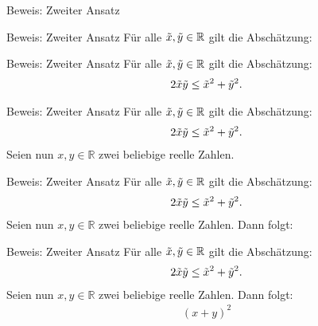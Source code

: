 \documentclass[10pt]{beamer}
\def\bR{\mathbb{R}}
\begin{document}
\begin{frame}{Beweis: Zweiter Ansatz}
    
\end{frame}



\begin{frame}{Beweis: Zweiter Ansatz}
    Für alle \( \Tilde{x}, \Tilde{y} \in \bR \) gilt die Abschätzung:
\end{frame}



\begin{frame}{Beweis: Zweiter Ansatz}
    Für alle \( \Tilde{x}, \Tilde{y} \in \bR \) gilt die Abschätzung:
    \begin{align*}
        2\Tilde{x}\Tilde{y}
        \leq \Tilde{x}^{2} + \Tilde{y}^{2}.
    \end{align*}
\end{frame}



\begin{frame}{Beweis: Zweiter Ansatz}
    Für alle \( \Tilde{x}, \Tilde{y} \in \bR \) gilt die Abschätzung:
    \begin{align*}
        2\Tilde{x}\Tilde{y}
        \leq \Tilde{x}^{2} + \Tilde{y}^{2}.
    \end{align*}
    Seien nun \( x, y \in \bR \) zwei beliebige reelle Zahlen.
\end{frame}



\begin{frame}{Beweis: Zweiter Ansatz}
    Für alle \( \Tilde{x}, \Tilde{y} \in \bR \) gilt die Abschätzung:
    \begin{align*}
        2\Tilde{x}\Tilde{y}
        \leq \Tilde{x}^{2} + \Tilde{y}^{2}.
    \end{align*}
    Seien nun \( x, y \in \bR \) zwei beliebige reelle Zahlen. Dann folgt:
\end{frame}




\begin{frame}{Beweis: Zweiter Ansatz}
    Für alle \( \Tilde{x}, \Tilde{y} \in \bR \) gilt die Abschätzung:
    \begin{align*}
        2\Tilde{x}\Tilde{y}
        \leq \Tilde{x}^{2} + \Tilde{y}^{2}.
    \end{align*}
    Seien nun \( x, y \in \bR \) zwei beliebige reelle Zahlen. Dann folgt:
    \begin{align*}
        \left( x + y \right)^{2}
    \end{align*}
\end{frame}
\end{document}
